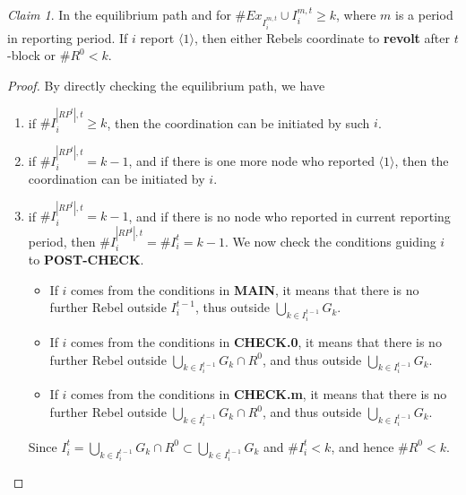 \documentclass[12pt,letterpaper]{article}
\newtheorem*{main result}{Main Result}
\theoremstyle{definition}
\theoremstyle{remark}
\theoremstyle{claim}
\newtheorem{claim}{Claim}
\begin{document}
\begin{claim}
\label{claim_either_success_or_fail}
In the equilibrium path and for $\#Ex_{I^{m,t}_i}\cup I^{m,t}_i\geq k$, where $m$ is a period in reporting period. If $i$ report $\langle 1 \rangle$, then either Rebels coordinate to \textbf{revolt} after $t$-block or $\# R^0<k$.
\end{claim}
\begin{proof}
By directly checking the equilibrium path, we have
\begin{enumerate}
\item if $\# I^{|RP^t|,t}_i\geq k$, then the coordination can be initiated by such $i$.
\item if $\# I^{|RP^t|,t}_i= k-1$, and if there is one more node who reported $\langle 1 \rangle$, then the coordination can be initiated by $i$.
\item if $\# I^{|RP^t|,t}_i= k-1$, and if there is no node who reported in current reporting period, then $\# I^{|RP^t|,t}_i=\# I^{t}_i= k-1$. We now check the conditions guiding $i$ to \textbf{POST-CHECK}.
\begin{itemize}
\item If $i$ comes from the conditions in \textbf{MAIN}, it means that there is no further Rebel outside $I^{t-1}_i$, thus outside $\bigcup_{k\in I^{t-1}_i}G_k$.
\item If $i$ comes from the conditions in \textbf{CHECK.0}, it means that there is no further Rebel outside $\bigcup_{k\in I^{t-1}_i}G_k\cap R^0$, and thus outside $\bigcup_{k\in I^{t-1}_i}G_k$. 
\item If $i$ comes from the conditions in \textbf{CHECK.m}, it means that there is no further Rebel outside $\bigcup_{k\in I^{t-1}_i}G_k\cap R^0$, and thus outside $\bigcup_{k\in I^{t-1}_i}G_k$. 
\end{itemize}
Since $I^t_i=\bigcup_{k\in I^{t-1}_i}G_k\cap R^0 \subset \bigcup_{k\in I^{t-1}_i}G_k$ and $\#I^t_i<k$, and hence $\# R^0<k$.

\end{enumerate}


\end{proof}
\end{document}
